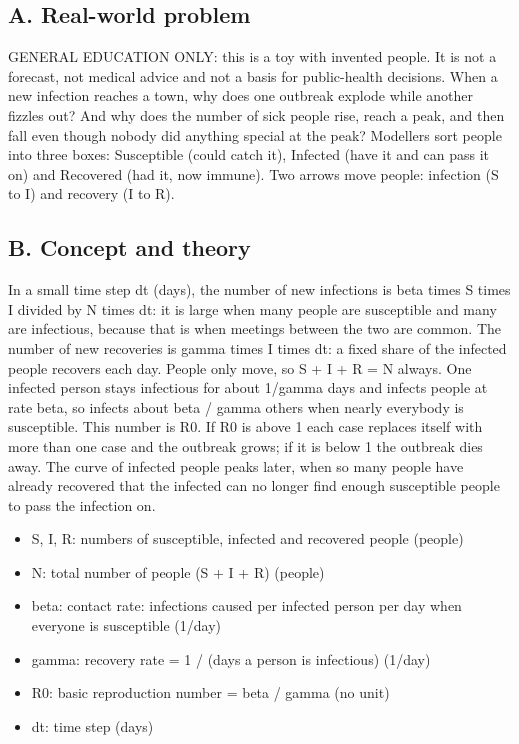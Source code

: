 \documentclass[11pt,a4paper]{article}
\begin{document}
\subsection*{A. Real-world problem}
GENERAL EDUCATION ONLY: this is a toy with invented people. It is not a forecast, not medical advice and not a basis for public-health decisions. When a new infection reaches a town, why does one outbreak explode while another fizzles out? And why does the number of sick people rise, reach a peak, and then fall even though nobody did anything special at the peak? Modellers sort people into three boxes: Susceptible (could catch it), Infected (have it and can pass it on) and Recovered (had it, now immune). Two arrows move people: infection (S to I) and recovery (I to R).

\subsection*{B. Concept and theory}
In a small time step dt (days), the number of new infections is beta times S times I divided by N times dt: it is large when many people are susceptible and many are infectious, because that is when meetings between the two are common. The number of new recoveries is gamma times I times dt: a fixed share of the infected people recovers each day. People only move, so S + I + R = N always. One infected person stays infectious for about 1/gamma days and infects people at rate beta, so infects about beta / gamma others when nearly everybody is susceptible. This number is R0. If R0 is above 1 each case replaces itself with more than one case and the outbreak grows; if it is below 1 the outbreak dies away. The curve of infected people peaks later, when so many people have already recovered that the infected can no longer find enough susceptible people to pass the infection on.

\begin{itemize}[nosep]
\item S, I, R: numbers of susceptible, infected and recovered people (people)
\item N: total number of people (S + I + R) (people)
\item beta: contact rate: infections caused per infected person per day when everyone is susceptible (1/day)
\item gamma: recovery rate = 1 / (days a person is infectious) (1/day)
\item R0: basic reproduction number = beta / gamma (no unit)
\item dt: time step (days)
\end{itemize}
\end{document}
